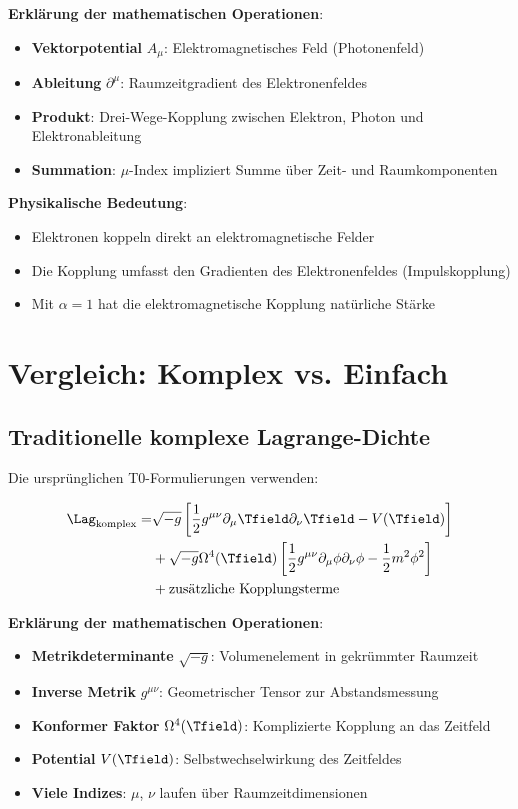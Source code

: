 	\textbf{Erklärung der mathematischen Operationen}:
	\begin{itemize}
		\item \textbf{Vektorpotential} $A_\mu$: Elektromagnetisches Feld (Photonenfeld)
		\item \textbf{Ableitung} $\partial^\mu$: Raumzeitgradient des Elektronenfeldes
		\item \textbf{Produkt}: Drei-Wege-Kopplung zwischen Elektron, Photon und Elektronableitung
		\item \textbf{Summation}: $\mu$-Index impliziert Summe über Zeit- und Raumkomponenten
	\end{itemize}
	
	\textbf{Physikalische Bedeutung}:
	\begin{itemize}
		\item Elektronen koppeln direkt an elektromagnetische Felder
		\item Die Kopplung umfasst den Gradienten des Elektronenfeldes (Impulskopplung)
		\item Mit $\alpha = 1$ hat die elektromagnetische Kopplung natürliche Stärke
	\end{itemize}
	
	\section{Vergleich: Komplex vs. Einfach}
	
	\subsection{Traditionelle komplexe Lagrange-Dichte}
	
	Die ursprünglichen T0-Formulierungen verwenden:
	
	\begin{align}
		\Lag_{\text{komplex}} = &\sqrt{-g} \left[\frac{1}{2} g^{\mu\nu} \partial_\mu \Tfield \partial_\nu \Tfield - V(\Tfield)\right] \\
		&+ \sqrt{-g} \Omega^4(\Tfield) \left[\frac{1}{2} g^{\mu\nu} \partial_\mu \phi \partial_\nu \phi - \frac{1}{2} m^2 \phi^2\right] \\
		&+ \text{zusätzliche Kopplungsterme}
	\end{align}
	
	\textbf{Erklärung der mathematischen Operationen}:
	\begin{itemize}
		\item \textbf{Metrikdeterminante} $\sqrt{-g}$: Volumenelement in gekrümmter Raumzeit
		\item \textbf{Inverse Metrik} $g^{\mu\nu}$: Geometrischer Tensor zur Abstandsmessung
		\item \textbf{Konformer Faktor} $\Omega^4(\Tfield)$: Komplizierte Kopplung an das Zeitfeld
		\item \textbf{Potential} $V(\Tfield)$: Selbstwechselwirkung des Zeitfeldes
		\item \textbf{Viele Indizes}: $\mu$, $\nu$ laufen über Raumzeitdimensionen
	\end{itemize}
	
